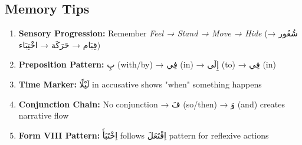 \documentclass[letter,12pt]{article}
\begin{document}
\subsection{Memory Tips}
\begin{enumerate}
\item \textbf{Sensory Progression:} Remember \textit{Feel → Stand → Move → Hide} (\textarabic{شُعُور} → \textarabic{قِيَام} → \textarabic{حَرَكَة} → \textarabic{اخْتِبَاء})
\item \textbf{Preposition Pattern:} \textarabic{بِ} (with/by) → \textarabic{فِي} (in) → \textarabic{إِلَى} (to) → \textarabic{فِي} (in)
\item \textbf{Time Marker:} \textarabic{لَيْلًا} in accusative shows "when" something happens
\item \textbf{Conjunction Chain:} No conjunction → \textarabic{فَ} (so/then) → \textarabic{وَ} (and) creates narrative flow
\item \textbf{Form VIII Pattern:} \textarabic{اِخْتَبَأَ} follows \textarabic{اِفْتَعَلَ} pattern for reflexive actions
\end{enumerate}
\end{document}
